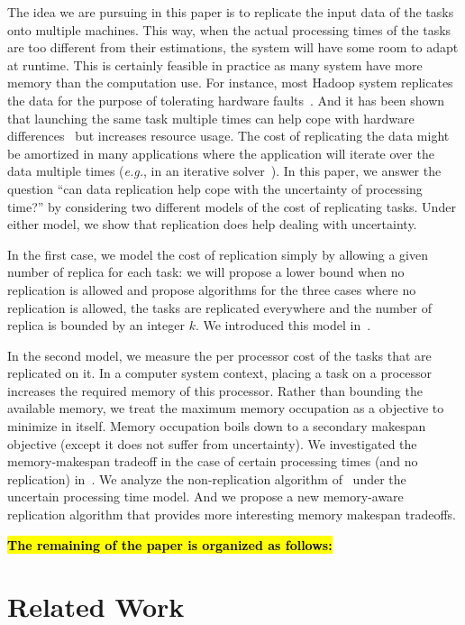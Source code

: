 \documentclass[twocolumn]{svjour3}
\newcommand{\todo}[1]{{\color{red}\textbf{\hl{#1}}\xspace}}
\begin{document}
The idea we are pursuing in this paper is to replicate the input data
of the tasks onto multiple machines. This way, when the actual
processing times of the tasks are too different from their
estimations, the system will have some room to adapt at runtime. This
is certainly feasible in practice as many system have more memory than
the computation use. For instance, most Hadoop system replicates the
data for the purpose of tolerating hardware
faults~\cite{White:2009:HDG:1717298}. And it has been shown that
launching the same task multiple times can help cope with hardware
differences~\cite{DBLP:journals/corr/WangJW14} but increases resource
usage. The cost of replicating the data might be amortized in many
applications where the application will iterate over the data multiple
times ({\em e.g.}, in an iterative
solver~\cite{Zhou12-P2S2,Zhou12-Cluster}). In this paper, we answer
the question ``can data replication help cope with the uncertainty of
processing time?'' by considering two different models of the cost of
replicating tasks. Under either model, we show that replication does
help dealing with uncertainty.

In the first case, we model the cost of replication simply by allowing
a given number of replica for each task: we will propose a lower bound
when no replication is allowed and propose algorithms for the three
cases where no replication is allowed, the tasks are replicated
everywhere and the number of replica is bounded by an integer
$k$. We introduced this model in~\cite{Chaubey15-APDCM}.

In the second model, we measure the per processor cost of the tasks
that are replicated on it. In a computer system context, placing a
task on a processor increases the required memory of this
processor. Rather than bounding the available memory, we treat the
maximum memory occupation as a objective to minimize in itself. Memory
occupation boils down to a secondary makespan objective (except it
does not suffer from uncertainty). We investigated the memory-makespan
tradeoff in the case of certain processing times (and no replication)
in~\cite{SDM2008}. We analyze the non-replication algorithm
of~\cite{SDM2008} under the uncertain processing time model. And we
propose a new memory-aware replication algorithm that provides more
interesting memory makespan tradeoffs.

\todo{The remaining of the paper is organized as follows: }

\section{Related Work}\label{sec3}
\end{document}
